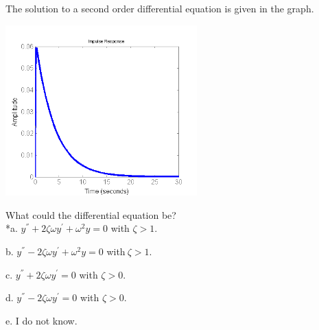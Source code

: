 
The solution to a second order differential equation is given in the graph.

\includegraphics[width=2.90392in,height=2.58948in]{../../Images/ODESolvingQ8.png}

What could the differential equation be? \\


*a. \( y^{''} + 2\zeta\omega y^{'} + \omega^{2}y = 0 \) with \( \zeta > 1 \).

b. \( y^{''} - 2\zeta\omega y^{'} + \omega^{2}y = 0 \) with\( \ \zeta > 1. \)

c. \( y^{''} + 2\zeta\omega y^{'} = 0 \) with \( \zeta > 0 \).

d. \( y^{''} - 2\zeta\omega y^{'} = 0 \) with \( \zeta > 0  \).

e. I do not know. \\
